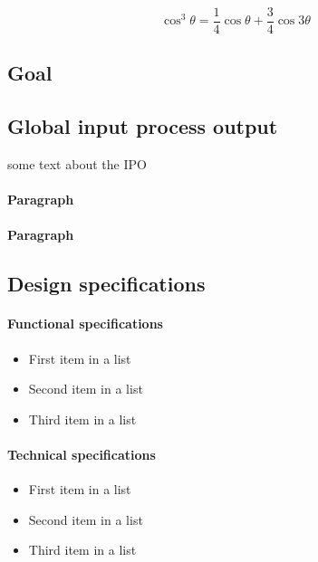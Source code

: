 \documentclass[fleqn,10pt]{SelfArx} %
\begin{document}
\lipsum[4] %

\begin{equation}
\cos^3 \theta =\frac{1}{4}\cos\theta+\frac{3}{4}\cos 3\theta
\label{eq:refname2}
\end{equation}

\lipsum[5] %

\subsection{Goal}

\lipsum[6] %

\subsection{Global input process output}
some text about the IPO
\paragraph{Paragraph} \lipsum[7] %
\paragraph{Paragraph} \lipsum[8] %

\subsection{Design specifications}

\paragraph{Functional specifications}
\begin{itemize}[noitemsep] %
	\item First item in a list
	\item Second item in a list
	\item Third item in a list
\end{itemize}

\paragraph{Technical specifications}
\begin{itemize}[noitemsep] %
	\item First item in a list
	\item Second item in a list
	\item Third item in a list
\end{itemize}
\end{document}
